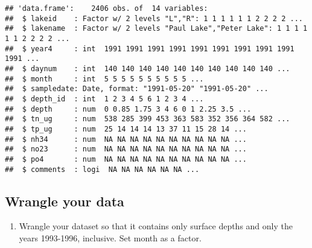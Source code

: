 \documentclass[
]{article}
\newenvironment{Shaded}{\begin{snugshade}}{\end{snugshade}}
\newcommand{\DecValTok}[1]{\textcolor[rgb]{0.00,0.00,0.81}{#1}}
\newcommand{\KeywordTok}[1]{\textcolor[rgb]{0.13,0.29,0.53}{\textbf{#1}}}
\newcommand{\NormalTok}[1]{#1}
\newcommand{\OperatorTok}[1]{\textcolor[rgb]{0.81,0.36,0.00}{\textbf{#1}}}
\newcommand{\StringTok}[1]{\textcolor[rgb]{0.31,0.60,0.02}{#1}}
\providecommand{\tightlist}{%
  \setlength{\itemsep}{0pt}\setlength{\parskip}{0pt}}
\begin{document}
\begin{verbatim}
## 'data.frame':    2406 obs. of  14 variables:
##  $ lakeid    : Factor w/ 2 levels "L","R": 1 1 1 1 1 1 2 2 2 2 ...
##  $ lakename  : Factor w/ 2 levels "Paul Lake","Peter Lake": 1 1 1 1 1 1 2 2 2 2 ...
##  $ year4     : int  1991 1991 1991 1991 1991 1991 1991 1991 1991 1991 ...
##  $ daynum    : int  140 140 140 140 140 140 140 140 140 140 ...
##  $ month     : int  5 5 5 5 5 5 5 5 5 5 ...
##  $ sampledate: Date, format: "1991-05-20" "1991-05-20" ...
##  $ depth_id  : int  1 2 3 4 5 6 1 2 3 4 ...
##  $ depth     : num  0 0.85 1.75 3 4 6 0 1 2.25 3.5 ...
##  $ tn_ug     : num  538 285 399 453 363 583 352 356 364 582 ...
##  $ tp_ug     : num  25 14 14 14 13 37 11 15 28 14 ...
##  $ nh34      : num  NA NA NA NA NA NA NA NA NA NA ...
##  $ no23      : num  NA NA NA NA NA NA NA NA NA NA ...
##  $ po4       : num  NA NA NA NA NA NA NA NA NA NA ...
##  $ comments  : logi  NA NA NA NA NA NA ...
\end{verbatim}

\hypertarget{wrangle-your-data}{%
\subsection{Wrangle your data}\label{wrangle-your-data}}

\begin{enumerate}
\def\labelenumi{\arabic{enumi}.}
\setcounter{enumi}{2}
\tightlist
\item
  Wrangle your dataset so that it contains only surface depths and only
  the years 1993-1996, inclusive. Set month as a factor.
\end{enumerate}

\begin{Shaded}
\end{Shaded}
\end{document}
